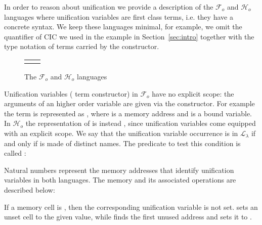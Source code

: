 \documentclass[sigconf,natbib=false,review]{acmart}
\newcommand{\llambda}{\ensuremath{\mathcal{L}_\lambda}\xspace}
\newcommand{\Fo}{\ensuremath{\mathcal{F}_{\!o}\xspace}} %
\newcommand{\Ho}{\ensuremath{\mathcal{H}_o}\xspace}
\begin{document}
In order to reason about unification we provide a description of the
\Fo{} and \Ho languages where unification variables
are first class terms, i.e. they have a concrete syntax. We keep these languages
minimal, for example, we omit the  quantifier of CIC we used
in the example in Section~\ref{sec:intro} together with the type notation of
terms carried by the  constructor.
%
\setlength{\abovecaptionskip}{0pt}
\setlength{\belowcaptionskip}{-13pt}

\begin{figure}[H]
  \begin{tabular}{ll}
  \begin{minipage}{0.21\textwidth}
   {code/fo_tm}
  \end{minipage}
  &
  \begin{minipage}{0.24\textwidth}
   {code/ho_tm}
  \end{minipage}
  \end{tabular}\vspace{4pt}
  \caption{The \Fo{} and \Ho languages}\vspace{0.3em}
  \label{code:common-terms}
\end{figure}

\noindent
Unification variables ( term constructor)
in \Fo{} have no explicit scope:
the arguments of an higher order variable are given via the 
constructor. For example the term  is represented as
, where  is a memory address and
 is a bound variable.\\
In \Ho the representation of  is instead ,
since unification variables come equipped with an explicit scope.
We say that the unification variable occurrence  is in
\llambda if and only if  is made of distinct names. The
predicate to test this condition is called :



\noindent
Natural numbers represent the memory addresses that
identify unification variables in both languages.
The memory and its associated operations are described below:



\noindent
If a memory cell is , then the corresponding unification variable
is not set.  sets an unset cell to the given value, while
 finds the first unused address and sets it to .
\end{document}
